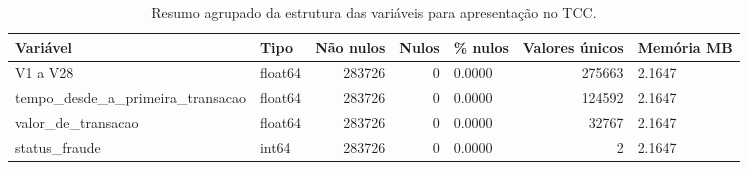 \begin{table}
\caption{Resumo agrupado da estrutura das variáveis para apresentação no TCC.}
\label{tab:resumo-tcc-estrutura}
\begin{tabular}{llrrlrl}
\toprule
Variável & Tipo & Não nulos & Nulos & \% nulos & Valores únicos & Memória MB \\
\midrule
V1 a V28 & float64 & 283726 & 0 & 0.0000 & 275663 & 2.1647 \\
tempo\_desde\_a\_primeira\_transacao & float64 & 283726 & 0 & 0.0000 & 124592 & 2.1647 \\
valor\_de\_transacao & float64 & 283726 & 0 & 0.0000 & 32767 & 2.1647 \\
status\_fraude & int64 & 283726 & 0 & 0.0000 & 2 & 2.1647 \\
\bottomrule
\end{tabular}
\end{table}
